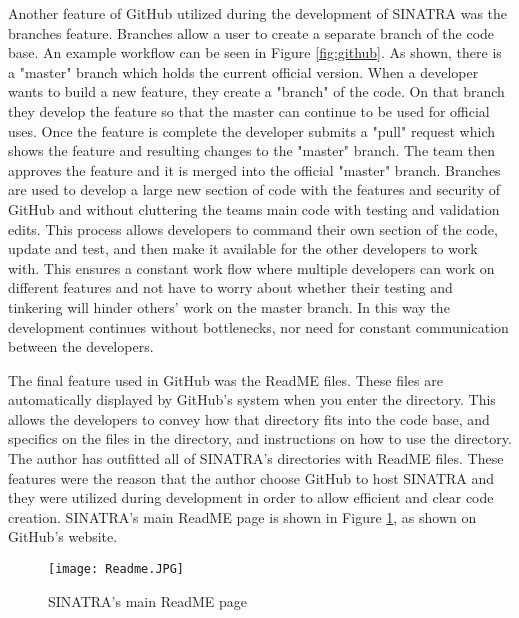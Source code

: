\indent Another feature of GitHub utilized during the development of SINATRA was the branches feature. Branches allow a user to create a separate branch of the code base. An example workflow can be seen in Figure \ref{fig:github}. As shown, there is a "master" branch which holds the current official version. When a developer wants to build a new feature, they create a "branch" of the code. On that branch they develop the feature so that the master can continue to be used for official uses. Once the feature is complete the developer submits a "pull" request which shows the feature and resulting changes to the "master" branch. The team then approves the feature and it is merged into the official "master" branch. Branches are used to develop a large new section of code with the features and security of GitHub and without cluttering the teams main code with testing and validation edits. This process allows developers to command their own section of the code, update and test, and then make it available for the other developers to work with. This ensures a constant work flow where multiple developers can work on different features and not have to worry about whether their testing and tinkering will hinder others’ work on the master branch. In this way the development continues without bottlenecks, nor need for constant communication between the developers. \par


\indent The final feature used in GitHub was the ReadME files. These files are automatically displayed by GitHub’s system when you enter the directory. This allows the developers to convey how that directory fits into the code base, and specifics on the files in the directory, and instructions on how to use the directory. The author has outfitted all of SINATRA’s directories with ReadME files. These features were the reason that the author choose GitHub to host SINATRA and they were utilized during development in order to allow efficient and clear code creation. SINATRA's main ReadME page is shown in Figure \ref{fig:readme}, as shown on GitHub's website. 

\begin{figure}
\texttt{[image: Readme.JPG]}
\centering
\caption{SINATRA's main ReadME page}
\label{fig:readme}
\end{figure}


